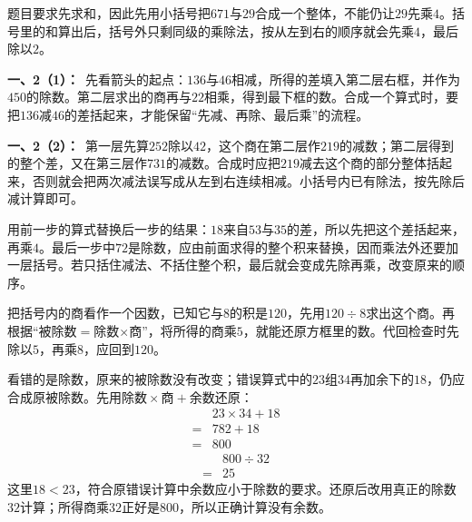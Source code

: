 \documentclass[multi=snippet,border=0pt]{standalone}
\newenvironment{snippet}[3]{\begin{minipage}{#1bp}\color{answerred}\fontsize{#2}{#3}\selectfont\raggedright}{\end{minipage}}
\begin{document}
\begin{snippet}{505}{11.5}{14}题目要求先求和，因此先用小括号把\(671\)与\(29\)合成一个整体，不能仍让\(29\)先乘\(4\)。括号里的和算出后，括号外只剩同级的乘除法，按从左到右的顺序就会先乘\(4\)，最后除以\(2\)。\end{snippet}
\begin{snippet}{505}{11.5}{14}\textbf{一、2（1）：}\ 先看箭头的起点：\(136\)与\(46\)相减，所得的差填入第二层右框，并作为\(450\)的除数。第二层求出的商再与\(22\)相乘，得到最下框的数。合成一个算式时，要把\(136\)减\(46\)的差括起来，才能保留“先减、再除、最后乘”的流程。\end{snippet}
\begin{snippet}{505}{11.5}{14}\textbf{一、2（2）：}\ 第一层先算\(252\)除以\(42\)，这个商在第二层作\(219\)的减数；第二层得到的整个差，又在第三层作\(731\)的减数。合成时应把\(219\)减去这个商的部分整体括起来，否则就会把两次减法误写成从左到右连续相减。小括号内已有除法，按先除后减计算即可。\end{snippet}
\begin{snippet}{505}{11.5}{14}用前一步的算式替换后一步的结果：\(18\)来自\(53\)与\(35\)的差，所以先把这个差括起来，再乘\(4\)。最后一步中\(72\)是除数，应由前面求得的整个积来替换，因而乘法外还要加一层括号。若只括住减法、不括住整个积，最后就会变成先除再乘，改变原来的顺序。\end{snippet}
\begin{snippet}{505}{11.5}{14}把括号内的商看作一个因数，已知它与\(8\)的积是\(120\)，先用\(120\div8\)求出这个商。再根据“被除数\(=\)除数\(\times\)商”，将所得的商乘\(5\)，就能还原方框里的数。代回检查时先除以\(5\)，再乘\(8\)，应回到\(120\)。\end{snippet}
\begin{snippet}{505}{11.5}{14}看错的是除数，原来的被除数没有改变；错误算式中的\(23\)组\(34\)再加余下的\(18\)，仍应合成原被除数。先用\(\text{除数}\times\text{商}+\text{余数}\)还原：\[\begin{aligned}&23\times34+18\\={}&782+18\\={}&800\end{aligned}\]\[\begin{aligned}&800\div32\\={}&25\end{aligned}\]这里\(18<23\)，符合原错误计算中余数应小于除数的要求。还原后改用真正的除数\(32\)计算；所得商乘\(32\)正好是\(800\)，所以正确计算没有余数。\end{snippet}
\end{document}
